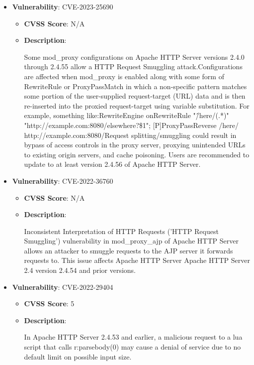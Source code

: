 \documentclass{article}
\begin{document}
\begin{itemize}
    
        \item \textbf{Vulnerability}: CVE-2023-25690
        \begin{itemize}
            \item \textbf{CVSS Score}:  N/A 
            \item \textbf{Description}:
            \parbox[t]{0.9\linewidth}{
                \ttfamily Some mod\_proxy configurations on Apache HTTP Server versions 2.4.0 through 2.4.55 allow a HTTP Request Smuggling attack.Configurations are affected when mod\_proxy is enabled along with some form of RewriteRule or ProxyPassMatch in which a non-specific pattern matches some portion of the user-supplied request-target (URL) data and is then re-inserted into the proxied request-target using variable substitution. For example, something like:RewriteEngine onRewriteRule "\^/here/(.*)" "http://example.com:8080/elsewhere?\$1"; [P]ProxyPassReverse /here/ http://example.com:8080/Request splitting/smuggling could result in bypass of access controls in the proxy server, proxying unintended URLs to existing origin servers, and cache poisoning. Users are recommended to update to at least version 2.4.56 of Apache HTTP Server.
            }
        \end{itemize}
    
        \item \textbf{Vulnerability}: CVE-2022-36760
        \begin{itemize}
            \item \textbf{CVSS Score}:  N/A 
            \item \textbf{Description}:
            \parbox[t]{0.9\linewidth}{
                \ttfamily Inconsistent Interpretation of HTTP Requests ('HTTP Request Smuggling') vulnerability in mod\_proxy\_ajp of Apache HTTP Server allows an attacker to smuggle requests to the AJP server it forwards requests to.  This issue affects Apache HTTP Server Apache HTTP Server 2.4 version 2.4.54 and prior versions.
            }
        \end{itemize}
    
        \item \textbf{Vulnerability}: CVE-2022-29404
        \begin{itemize}
            \item \textbf{CVSS Score}:  5 
            \item \textbf{Description}:
            \parbox[t]{0.9\linewidth}{
                \ttfamily In Apache HTTP Server 2.4.53 and earlier, a malicious request to a lua script that calls r:parsebody(0) may cause a denial of service due to no default limit on possible input size.
            }
        \end{itemize}
    

\end{itemize}
\end{document}

